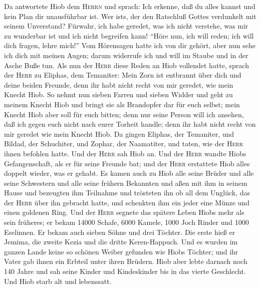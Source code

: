  Da antwortete Hiob dem \textsc{Herrn} und sprach:
 Ich erkenne, daß du alles kannst und kein Plan dir
unausführbar ist.  Wer ist\textquotesingle s, der den
Ratschluß Gottes verdunkelt mit seinem Unverstand? Fürwahr, ich habe
geredet, was ich nicht verstehe, was mir zu wunderbar ist und ich nicht
begreifen kann!  ``Höre nun, ich will reden; ich will dich
fragen, lehre mich!''  Vom Hörensagen hatte ich von dir
gehört, aber nun sehe ich dich mit meinen Augen;  darum
widerrufe ich und will im Staube und in der Asche Buße tun.
 Als nun der \textsc{Herr} diese Reden an Hiob vollendet
hatte, sprach der \textsc{Herr} zu Eliphas, dem Temaniter: Mein Zorn ist
entbrannt über dich und deine beiden Freunde, denn ihr habt nicht recht
von mir geredet, wie mein Knecht Hiob.  So nehmt nun
sieben Farren und sieben Widder und geht zu meinem Knecht Hiob und
bringt sie als Brandopfer dar für euch selbst; mein Knecht Hiob aber
soll für euch bitten; denn nur seine Person will ich ansehen, daß ich
gegen euch nicht nach eurer Torheit handle; denn ihr habt nicht recht
von mir geredet wie mein Knecht Hiob.  Da gingen Eliphas,
der Temaniter, und Bildad, der Schuchiter, und Zophar, der Naamatiter,
und taten, wie der \textsc{Herr} ihnen befohlen hatte. Und der
\textsc{Herr} sah Hiob an.  Und der \textsc{Herr} wandte
Hiobs Gefangenschaft, als er für seine Freunde bat; und der
\textsc{Herr} erstattete Hiob alles doppelt wieder, was er gehabt.
 Es kamen auch zu Hiob alle seine Brüder und alle seine
Schwestern und alle seine frühern Bekannten und aßen mit ihm in seinem
Hause und bezeugten ihm Teilnahme und trösteten ihn ob all dem Unglück,
das der \textsc{Herr} über ihn gebracht hatte, und schenkten ihm ein
jeder eine Münze und einen goldenen Ring.  Und der
\textsc{Herr} segnete das spätere Leben Hiobs mehr als sein früheres; er
bekam 14000 Schafe, 6000 Kamele, 1000 Joch Rinder und 1000 Eselinnen.
 Er bekam auch sieben Söhne und drei Töchter.
 Die erste hieß er Jemima, die zweite Kezia und die
dritte Keren-Happuch.  Und es wurden im ganzen Lande
keine so schönen Weiber gefunden wie Hiobs Töchter; und ihr Vater gab
ihnen ein Erbteil unter ihren Brüdern.  Hiob aber lebte
darnach noch 140 Jahre und sah seine Kinder und Kindeskinder bis in das
vierte Geschlecht.  Und Hiob starb alt und lebenssatt.
